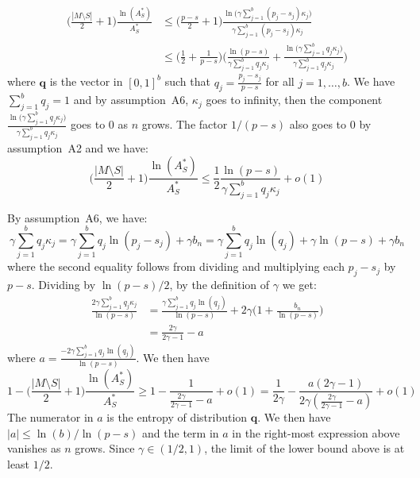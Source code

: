 \documentclass[aos]{imsart}
\theoremstyle{plain}
\newcommand{\bs}{\boldsymbol}
\begin{document}
\begin{supplement}
\begin{align*}
\Big(\frac{|M\setminus S|}{2}+1\Big)\frac{\ln(A_S^*)}{A_S^*} 
&\leq \Big(\frac{p-s}{2}+1\Big)\frac{\ln\big(\gamma\sum_{j=1}^b(p_j-s_j)\kappa_j\big)}{\gamma\sum_{j=1}^b(p_j-s_j)\kappa_j} \\
&\leq \Big(\frac{1}{2}+\frac{1}{p-s}\Big)\bigg(\frac{\ln(p-s)}{\gamma\sum_{j=1}^bq_j\kappa_j}+\frac{\ln\big(\gamma\sum_{j=1}^bq_j\kappa_j\big)}{\gamma\sum_{j=1}^bq_j\kappa_j}\Bigg)
\end{align*}
where $\bs q$ is the vector in $[0,1]^b$ such that  $q_j=\frac{p_j-s_j}{p-s}$ for all $j=1,\ldots,b$. We have $\sum_{j=1}^b q_j=1$ and by assumption~A6, $\kappa_j$ goes to infinity, then the component $\frac{\ln\big(\gamma\sum_{j=1}^bq_j\kappa_j\big)}{\gamma\sum_{j=1}^bq_j\kappa_j}$ goes to 0 as $n$ grows. The factor $1/(p-s)$ also goes to 0 by assumption~A2 and we have:
$$\Big(\frac{|M\setminus S|}{2}+1\Big)\frac{\ln(A_S^*)}{A_S^*} 
\leq \frac{1}{2}\frac{\ln(p-s)}{\gamma\sum_{j=1}^bq_j\kappa_j} + o(1)$$

By assumption~A6, we have:
$$
\gamma\sum_{j=1}^bq_j\kappa_j
=\gamma\sum_{j=1}^bq_j\ln(p_j-s_j) + \gamma b_n
=\gamma\sum_{j=1}^bq_j\ln(q_j)+ \gamma \ln(p-s) + \gamma b_n
$$
where the second equality follows from dividing and multiplying each $p_j-s_j$ by $p-s$. Dividing by $\ln(p-s)/2$, by the definition of $\gamma$ we get:
\begin{align*}
    \frac{2\gamma\sum_{j=1}^bq_j\kappa_j}{\ln(p-s)}
&=\frac{\gamma\sum_{j=1}^bq_j\ln(q_j)}{\ln(p-s)} + 2\gamma \Big(1+\frac{b_n}{\ln(p-s)}\Big) \\
&=  \frac{2\gamma }{2\gamma -1}-a
\end{align*}
where $a=\frac{-2\gamma\sum_{j=1}^bq_j\ln(q_j)}{\ln(p-s)}$. We then have
$$1-\Big(\frac{|M\setminus S|}{2}+1\Big)\frac{\ln(A_S^*)}{A_S^*} 
\geq 1- \frac{1}{\frac{2\gamma }{2\gamma -1}-a} + o(1) = \frac{1}{2\gamma}- \frac{a(2\gamma -1)}{2\gamma(\frac{2\gamma }{2\gamma -1}-a)} + o(1)$$
The numerator in $a$ is the entropy of distribution $\bs q$. We then have $|a|\leq \ln(b)/\ln(p-s)$ and the term in $a$ in the right-most expression above vanishes as $n$ grows. Since $\gamma\in(1/2,1)$, the limit of the lower bound above is at least $1/2$. 


\end{supplement}
\end{document}
